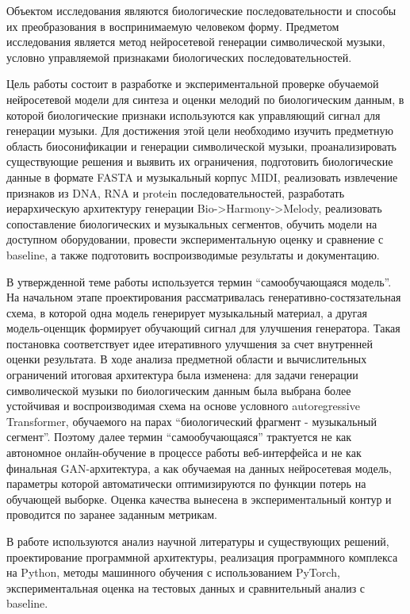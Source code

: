 Объектом исследования являются биологические последовательности и способы их преобразования в воспринимаемую человеком форму. Предметом исследования является метод нейросетевой генерации символической музыки, условно управляемой признаками биологических последовательностей.

Цель работы состоит в разработке и экспериментальной проверке обучаемой нейросетевой модели для синтеза и оценки мелодий по биологическим данным, в которой биологические признаки используются как управляющий сигнал для генерации музыки. Для достижения этой цели необходимо изучить предметную область биосонификации и генерации символической музыки, проанализировать существующие решения и выявить их ограничения, подготовить биологические данные в формате FASTA и музыкальный корпус MIDI, реализовать извлечение признаков из DNA, RNA и protein последовательностей, разработать иерархическую архитектуру генерации Bio->Harmony->Melody, реализовать сопоставление биологических и музыкальных сегментов, обучить модели на доступном оборудовании, провести экспериментальную оценку и сравнение с baseline, а также подготовить воспроизводимые результаты и документацию.

В утвержденной теме работы используется термин ``самообучающаяся модель''. На начальном этапе проектирования рассматривалась генеративно-состязательная схема, в которой одна модель генерирует музыкальный материал, а другая модель-оценщик формирует обучающий сигнал для улучшения генератора. Такая постановка соответствует идее итеративного улучшения за счет внутренней оценки результата. В ходе анализа предметной области и вычислительных ограничений итоговая архитектура была изменена: для задачи генерации символической музыки по биологическим данным была выбрана более устойчивая и воспроизводимая схема на основе условного autoregressive Transformer, обучаемого на парах ``биологический фрагмент - музыкальный сегмент''. Поэтому далее термин ``самообучающаяся'' трактуется не как автономное онлайн-обучение в процессе работы веб-интерфейса и не как финальная GAN-архитектура, а как обучаемая на данных нейросетевая модель, параметры которой автоматически оптимизируются по функции потерь на обучающей выборке. Оценка качества вынесена в экспериментальный контур и проводится по заранее заданным метрикам.

В работе используются анализ научной литературы и существующих решений, проектирование программной архитектуры, реализация программного комплекса на Python, методы машинного обучения с использованием PyTorch, экспериментальная оценка на тестовых данных и сравнительный анализ с baseline.

